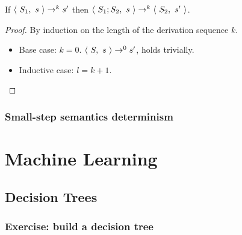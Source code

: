\documentclass[12pt,a4paper,oneside]{book}
\begin{document}
\begin{theorem}
     If $\langle\ S_1,\ s\ \rangle \to^k s'$ then $\langle\ S_1;S_2,\ s\ \rangle \to^k \langle\ S_2,\ s'\ \rangle$.

     \begin{proof}
        By induction on the length of the derivation sequence $k$.

        \begin{itemize}
            \item Base case: $k = 0$. $\langle\ S,\ s\ \rangle \to^0 s'$, holds trivially.
            \item Inductive case: $l = k+1$.
        \end{itemize}

     \end{proof}
\end{theorem}

\subsection{Small-step semantics determinism}

\chapter{Machine Learning}

\section{Decision Trees}

\subsection{Exercise: build a decision tree}
\end{document}
